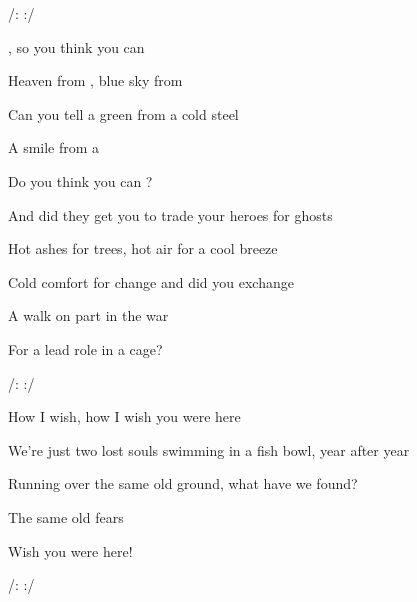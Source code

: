 
/:    :/       

\zs
{}, so you think you can 

Heaven from , blue sky from 

Can you tell a green  from a cold steel 

A smile from a 

Do you think you can ?
\ks

\zs
And did they get you to {trade} your heroes for {ghosts}

Hot ashes for {trees}, hot air for a cool {breeze}

Cold comfort for {change}
and did you exchange

A walk on part in the {war}

For a lead role in a cage?
\ks

/:    :/       

\zs
{How} I wish, how I wish you were {here}

We're just {two} lost souls swimming in a fish bowl, {year} after year

{Running} over the same old ground, what {have} we found?

The same old {fears}

Wish you were {here}!
\ks

/:    :/       


\kp



















